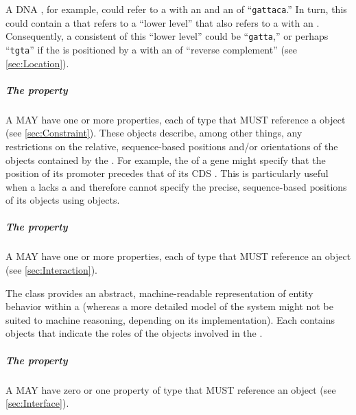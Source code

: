 A DNA , for example, could refer to a  with an   and an   of ``{\tt gattaca}.'' In turn, this  could contain a  that refers to a ``lower level''   that also refers to a  with an  . Consequently, a consistent   of this ``lower level''  could be ``{\tt gatta},'' or perhaps ``{\tt tgta}'' if the  is positioned by a  with an  of ``reverse complement'' (see \ref{sec:Location}).

\subparagraph{The  property}
\label{sec:hasConstraint}

A  MAY have one or more  properties, each of type  that MUST reference a  object (see \ref{sec:Constraint}).  These objects describe, among other things, any restrictions on the relative, sequence-based positions and/or orientations of the  objects contained by the .
For example, the  of a gene might specify that the position of its promoter  precedes that of its CDS . This is particularly useful when a  lacks a  and therefore cannot specify the precise, sequence-based positions of its  objects using  objects.

\subparagraph{The  property}\label{sec:hasInteraction}

A  MAY have one or more  properties, each of type  that MUST reference an  object (see \ref{sec:Interaction}).  

The  class provides an abstract, machine-readable representation of entity behavior within a  (whereas a more detailed model of the system might not be suited to machine reasoning, depending on its implementation).
Each  contains  objects that indicate the roles of the  objects involved in the .

\subparagraph{The  property}\label{sec:hasInterface}

A  MAY have zero or one  property of type  that MUST reference an  object (see \ref{sec:Interface}).  

